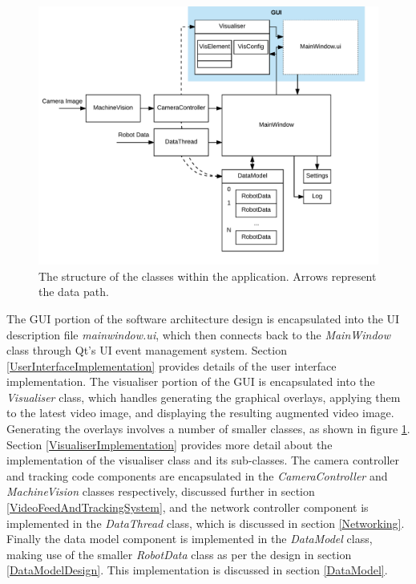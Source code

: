 \begin{figure}
	\centering
	\includegraphics[scale=0.8]{Figures/ApplicationStructure.png}
	\decoRule
	\caption[Application Structure]{The structure of the classes within the application. Arrows represent the data path.}
	\label{fig:ApplicationStructure}
\end{figure}

The GUI portion of the software architecture design is encapsulated into the UI description file \textit{mainwindow.ui}, which then connects back to the \textit{MainWindow} class through Qt's UI event management system. Section \ref{UserInterfaceImplementation} provides details of the user interface implementation. The visualiser portion of the GUI is encapsulated into the \textit{Visualiser} class, which handles generating the graphical overlays, applying them to the latest video image, and displaying the resulting augmented video image. Generating the overlays involves a number of smaller classes, as shown in figure \ref{fig:ApplicationStructure}. Section \ref{VisualiserImplementation} provides more detail about the implementation of the visualiser class and its sub-classes. The camera controller and tracking code components are encapsulated in the \textit{CameraController} and \textit{MachineVision} classes respectively, discussed further in section \ref{VideoFeedAndTrackingSystem}, and the network controller component is implemented in the \textit{DataThread} class, which is discussed in section \ref{Networking}. Finally the data model component is implemented in the \textit{DataModel} class, making use of the smaller \textit{RobotData} class as per the design in section \ref{DataModelDesign}. This implementation is discussed in section \ref{DataModel}.

